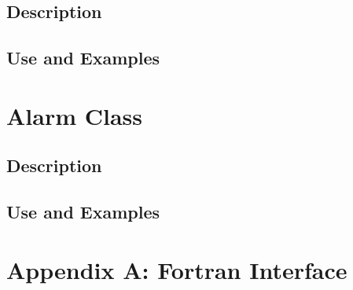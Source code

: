\documentclass[]{article}
\begin{document}
\subsection{Description}


\subsection{Use and Examples}


\newpage
\section{Alarm Class}

\subsection{Description}


\subsection{Use and Examples}




% 
%

\newpage
\setcounter{section}{1}
\renewcommand{\thesection}{\Alph{section}}
\renewcommand{\thesubsection}{\thesection\arabic{subsection}}

\section*{Appendix A:  Fortran Interface}









\newpage
\setcounter{section}{2}
\renewcommand{\thesection}{\Alph{section}}
\renewcommand{\thesubsection}{\thesection\arabic{subsection}}
\end{document}
